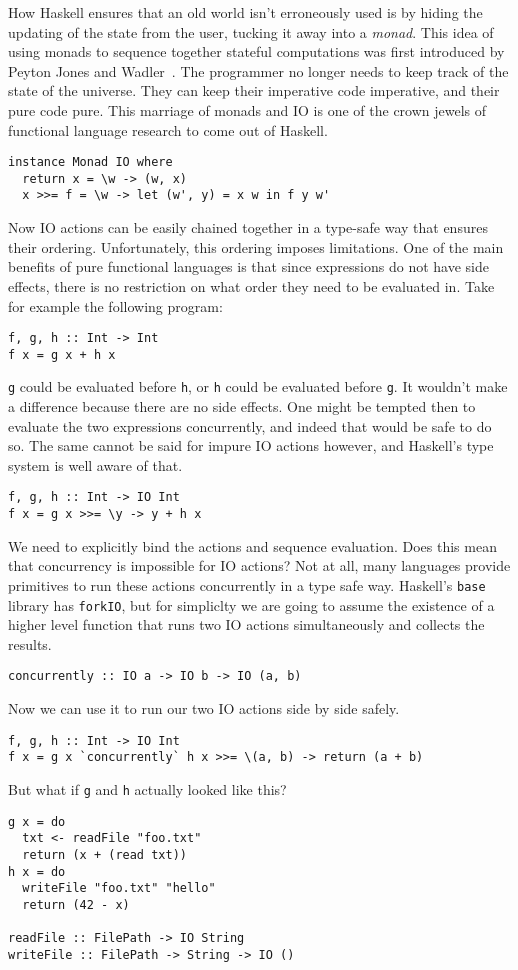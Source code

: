 \documentclass{report}
\begin{document}
How Haskell ensures that an old world isn't erroneously used is by hiding the
updating of the state from the user, tucking it away into a \textit{monad}. This
idea of using monads to sequence together stateful computations was first
introduced by Peyton Jones and
Wadler~\cite{peytonjones1993}\cite{wadler1995}. The programmer no longer needs
to keep track of the state of the universe. They can keep their imperative code
imperative, and their pure code pure. This marriage of monads and IO is one of
the crown jewels of functional language research to come out of Haskell.
\begin{verbatim}
instance Monad IO where
  return x = \w -> (w, x)
  x >>= f = \w -> let (w', y) = x w in f y w'
\end{verbatim}
Now IO actions can be easily chained together in a type-safe way that ensures
their ordering.  Unfortunately, this ordering imposes limitations. One of the
main benefits of pure functional languages is that since expressions do not
have side effects, there is no restriction on what order they need to be
evaluated in.  Take for example the following program:
\begin{verbatim}
f, g, h :: Int -> Int
f x = g x + h x
\end{verbatim}
\texttt{g} could be evaluated before \texttt{h}, or \texttt{h} could be
evaluated before \texttt{g}. It wouldn't make a difference because there are no
side effects. One might be tempted then to evaluate the two expressions
concurrently, and indeed that would be safe to do so.  The same cannot be said
for impure IO actions however, and Haskell's type system is well aware of that.
\begin{verbatim}
f, g, h :: Int -> IO Int
f x = g x >>= \y -> y + h x
\end{verbatim}
We need to explicitly bind the actions and sequence evaluation.  Does this mean
that concurrency is impossible for IO actions? Not at all, many languages
provide primitives to run these actions concurrently in a type safe
way. Haskell's \texttt{base} library has \texttt{forkIO}, but for
simpliclty we are going to assume the existence of a higher level function that
runs two IO actions simultaneously and collects the results.
\begin{verbatim}
concurrently :: IO a -> IO b -> IO (a, b)
\end{verbatim}
Now we can use it to run our two IO actions side by side safely. 
\begin{verbatim}
f, g, h :: Int -> IO Int
f x = g x `concurrently` h x >>= \(a, b) -> return (a + b)
\end{verbatim}
But what if \texttt{g} and \texttt{h} actually looked like this?
\begin{verbatim}
g x = do
  txt <- readFile "foo.txt"
  return (x + (read txt))
h x = do
  writeFile "foo.txt" "hello"
  return (42 - x)

readFile :: FilePath -> IO String
writeFile :: FilePath -> String -> IO ()
\end{verbatim}
\end{document}
